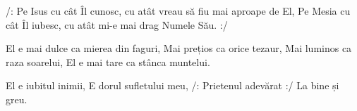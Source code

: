 \beginverse
/: Pe Isus cu cât Îl cunosc, cu atât vreau să fiu mai aproape de El,
Pe Mesia cu cât Îl iubesc, cu atât mi-e mai drag Numele Său. :/
\endverse

\beginchorus
El e mai dulce ca mierea din faguri,
Mai prețios ca orice tezaur,
Mai luminos ca raza soarelui,
El e mai tare ca stânca muntelui.
\endchorus

\beginverse*
El e iubitul inimii,
E dorul sufletului meu,
/: Prietenul adevărat :/
La bine și greu.
\endverse
\endsong